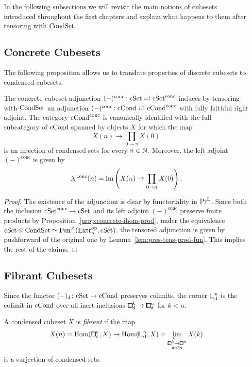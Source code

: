In the following subsections we will revisit the main notions of cubesets introduced throughout the first chapters
and explain what happens to them after tensoring with $\mathrm{CondSet}$.


\subsection{Concrete Cubesets}

The following proposition allows us to translate properties of discrete cubesets to condensed cubesets.

\begin{proposition}
The concrete cubeset adjunction $(-)^\mathrm{conc}\colon\mathrm{cSet}\rightleftarrows\mathrm{cSet}^\mathrm{conc}$
induces by tensoring with $\mathrm{CondSet}$ an adjunction
$(-)^\mathrm{conc}\colon\mathrm{cCond}\rightleftarrows\mathrm{cCond}^\mathrm{conc}$
with fully faithful right adjoint.
The category $\mathrm{cCond}^\mathrm{conc}$ is canonically identified with the full subcategory of $\mathrm{cCond}$
spanned by objects $X$ for which the map
\[
    X(n) \to \prod_{0\to n} X(0)
\]
is an injection of condensed sets for every $n\in{\mathbb{N}}$.
Moreover, the left adjoint $(-)^\mathrm{conc}$ is given by
\[
    X^\mathrm{conc}(n) = \operatorname{im}\left(X(n)\to\prod_{0\to n}X(0)\right).
\]
\end{proposition}

\begin{proof}
The existence of the adjunction is clear by functoriality in $\mathrm{Pr}^\mathrm{L}$.
Since both the inclusion $\mathrm{cSet}^\mathrm{conc}\to\mathrm{cSet}$ and its left adjoint $(-)^\mathrm{conc}$ preserve finite products
by Proposition~\ref{prop:concrete-ihom-prod},
under the equivalence $\mathrm{cSet}\otimes\mathrm{CondSet}\simeq\operatorname{Fun}^\times(\mathrm{Extr}_\kappa^{\mathrm{op}},\mathrm{cSet})$,
the tensored adjunction is given by pushforward of the original one by Lemma~\ref{lem:pres-tens-prod-fun}.
This implies the rest of the claims.
\end{proof}


\subsection{Fibrant Cubesets}

Since the functor $(-)_{\mathrm{d}}\colon\mathrm{cSet}\to\mathrm{cCond}$ preserves colimits,
the corner ${\bbcor}^n_\ud$ is the colimit in $\mathrm{cCond}$ over all inert inclusions ${\bbox}^k_\ud\to{\bbox}^n_\ud$ for $k<n$.

\begin{definition}
A condensed cubeset $X$ is \emph{fibrant} if the map
\[
    X(n) = \hom({\bbox}^n_\ud,X)\to\hom({\bbcor}^n_\ud,X) = \varprojlim_{\substack{{\bbox}^k\to{\bbox}^n\\k<n}}X(k)
\]
is a surjection of condensed sets.
\end{definition}

